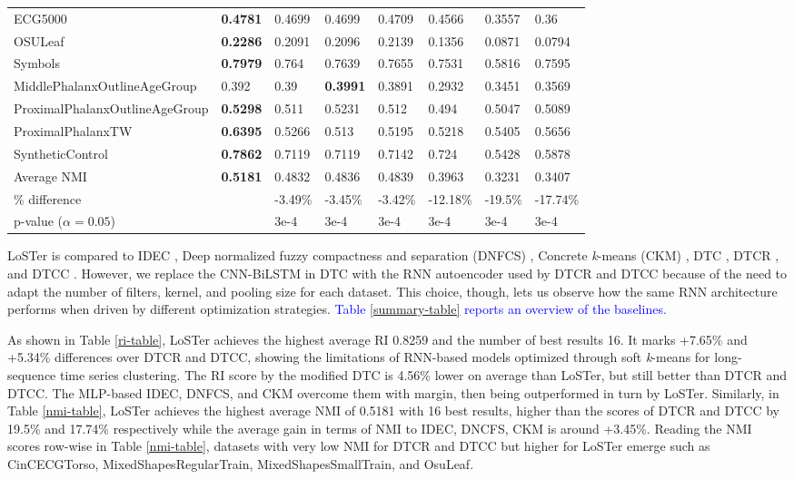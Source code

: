 \documentclass[times, review, 10pt]{elsarticle}
\begin{document}
\begin{table}[!tb]
{\begin{tabular}{llllllll}
    ECG5000 & \textbf{0.4781} & 0.4699 & 0.4699 & 0.4709 & 0.4566 & 0.3557 & 0.36\\
    OSULeaf & \textbf{0.2286} & 0.2091 & 0.2096 & 0.2139 & 0.1356 & 0.0871 & 0.0794\\
    Symbols & \textbf{0.7979} & 0.764 & 0.7639 & 0.7655 & 0.7531 & 0.5816 & 0.7595\\
    MiddlePhalanxOutlineAgeGroup & 0.392 & 0.39 & \textbf{0.3991} & 0.3891 & 0.2932 & 0.3451 & 0.3569\\
    ProximalPhalanxOutlineAgeGroup & \textbf{0.5298} & 0.511 & 0.5231 & 0.512 & 0.494 & 0.5047 & 0.5089\\
    ProximalPhalanxTW & \textbf{0.6395} & 0.5266 & 0.513 & 0.5195 & 0.5218 & 0.5405 & 0.5656\\
    SyntheticControl & \textbf{0.7862} & 0.7119 & 0.7119 & 0.7142 & 0.724 & 0.5428 & 0.5878\\
    \midrule
    Average NMI & \textbf{0.5181} & 0.4832 & 0.4836 & 0.4839 & 0.3963 & 0.3231 & 0.3407\\
    \% difference &  & -3.49\% & -3.45\% & -3.42\% & -12.18\% & -19.5\% & -17.74\%\\
    p-value ($\alpha=0.05$) &  & 3e-4 & 3e-4 & 3e-4 & 3e-4 & 3e-4 & 3e-4\\
    \bottomrule
  \end{tabular}}
  \vskip -0.1in
\end{table}

LoSTer is compared to IDEC \cite{guo2017improved}, Deep normalized fuzzy compactness and separation (DNFCS) \cite{feng2020deep}, Concrete \textit{k}-means (CKM) \cite{gao2020deep}, DTC \cite{madiraju2018deep}, DTCR \cite{ma2019learning}, and DTCC \cite{zhong2023deep}. However, we replace the CNN-BiLSTM in DTC with the RNN autoencoder used by DTCR and DTCC because of the need to adapt the number of filters, kernel, and pooling size for each dataset. This choice, though, lets us observe how the same RNN architecture performs when driven by different optimization strategies. \textcolor{blue}{Table \ref{summary-table} reports an overview of the baselines.}

As shown in Table \ref{ri-table}, LoSTer achieves the highest average RI 0.8259 and the number of best results 16. It marks +7.65\% and +5.34\% differences over DTCR and DTCC, showing the limitations of RNN-based models optimized through soft \textit{k}-means for long-sequence time series clustering. The RI score by the modified DTC is 4.56\% lower on average than LoSTer, but still better than DTCR and DTCC. The MLP-based IDEC, DNFCS, and CKM overcome them with margin, then being outperformed in turn by LoSTer. Similarly, in Table \ref{nmi-table}, LoSTer achieves the highest average NMI of 0.5181 with 16 best results, higher than the scores of DTCR and DTCC by 19.5\% and 17.74\% respectively while the average gain in terms of NMI to IDEC, DNCFS, CKM is around +3.45\%. Reading the NMI scores row-wise in Table \ref{nmi-table}, datasets with very low NMI for DTCR and DTCC but higher for LoSTer emerge such as CinCECGTorso, MixedShapesRegularTrain, MixedShapesSmallTrain, and OsuLeaf.
\end{document}
